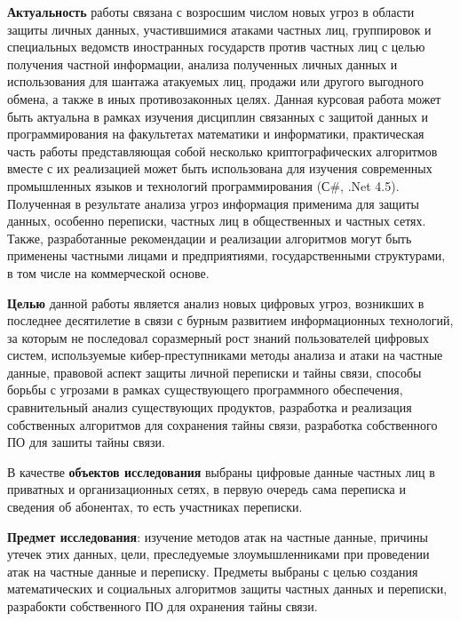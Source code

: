 \textbf{Актуальность} работы  связана с возросшим числом новых угроз в области защиты личных данных, участившимися атаками частных лиц, группировок и специальных ведомств иностранных государств против частных лиц с целью получения частной информации, анализа полученных личных данных   и использования для шантажа атакуемых лиц, продажи или другого выгодного обмена, а также  в иных противозаконных целях. Данная курсовая работа может быть актуальна в рамках изучения дисциплин связанных с защитой данных и программирования на факультетах математики и информатики, практическая часть работы представляющая собой несколько криптографических алгоритмов вместе с их реализацией может быть использована для изучения современных промышленных языков и технологий программирования (С\#, .Net 4.5). Полученная в результате анализа угроз информация применима для защиты   данных, особенно переписки, частных лиц в общественных и частных сетях. Также, разработанные рекомендации и реализации алгоритмов могут быть применены частными лицами и предприятиями, государственными структурами, в том числе на коммерческой основе. 

\textbf{Целью} данной работы является %
 анализ новых цифровых угроз, возникших в последнее десятилетие в связи с бурным развитием информационных технологий, за которым не последовал соразмерный рост знаний пользователей цифровых систем, используемые кибер-преступниками методы анализа и атаки на частные данные, правовой аспект защиты личной переписки и тайны связи, способы борьбы с угрозами  в рамках существующего программного обеспечения, %
 сравнительный анализ существующих продуктов, разработка и реализация собственных алгоритмов для сохранения тайны связи, разработка собственного ПО для зашиты тайны связи.	
 
 В качестве \textbf{объектов исследования} выбраны цифровые данные частных лиц в приватных и организационных сетях, в первую очередь сама  переписка и сведения об абонентах, то есть участниках переписки.
 
 \textbf{Предмет исследования}: изучение методов атак на частные данные, причины утечек этих данных, цели, преследуемые злоумышленниками при проведении атак на частные данные и переписку. Предметы выбраны  с целью создания математических и социальных алгоритмов защиты частных данных и переписки, разрабокти собственного ПО для охранения тайны связи.
 \newpage %
